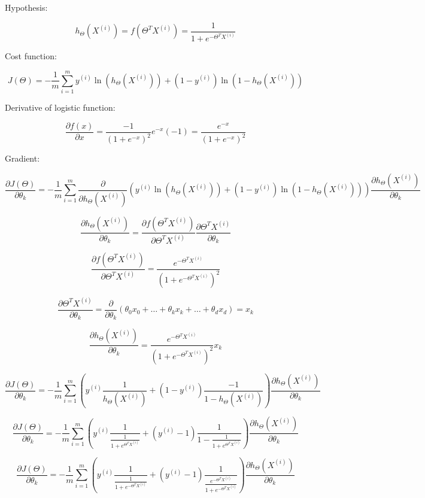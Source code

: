\documentclass[a4, article]{article}
\begin{document}
Hypothesis:

\[ h_{\Theta}(X^{(i)}) = f(\Theta^T X^{(i)}) = \frac{1}{1 + e^{-\Theta^T X^{(i)}}} \]

Cost function:

\[ J(\Theta) = - \frac{1}{m} \sum_{i=1}^{m} y^{(i)} \ln(h_{\Theta}(X^{(i)})) + (1 - y^{(i)}) \ln(1 - h_{\Theta}(X^{(i)})) \]

Derivative of logistic function:

\[ \frac{\partial f(x) }{\partial x} = \frac{-1}{(1 + e^{-x})^2} e^{-x} (-1)  = \frac{e^{-x}}{(1 + e^{-x})^2}\]

Gradient:

\[ \frac{\partial J(\Theta)}{\partial \theta_k} = - \frac{1}{m} \sum_{i=1}^{m} \frac{\partial}{\partial h_{\Theta}(X^{(i)})}(y^{(i)} \ln(h_{\Theta}(X^{(i)})) + (1 - y^{(i)}) \ln(1 - h_{\Theta}(X^{(i)}))) \frac{\partial h_{\Theta}(X^{(i)})}{\partial \theta_k} \]

\[ \frac{\partial h_{\Theta}(X^{(i)})}{\partial \theta_k} = \frac{\partial f(\Theta^T X^{(i)})}{\partial \Theta^T X^{(i)}} \frac{\partial \Theta^T X^{(i)}}{\partial \theta_k} \]

\[ \frac{\partial f(\Theta^T X^{(i)})}{\partial \Theta^T X^{(i)}} = \frac{e^{-\Theta^T X^{(i)}}}{(1 + e^{-\Theta^T X^{(i)}})^2} \]

\[ \frac{\partial \Theta^T X^{(i)}}{\partial \theta_k} = \frac{\partial}{\partial \theta_k}(\theta_0 x_0 + \dots + \theta_k x_k + \dots + \theta_d x_d ) = x_k\]

\[ \frac{\partial h_{\Theta}(X^{(i)})}{\partial \theta_k} = \frac{e^{-\Theta^T X^{(i)}}}{(1 + e^{-\Theta^T X^{(i)}})^2} x_k \]

\[ \frac{\partial J(\Theta)}{\partial \theta_k} = - \frac{1}{m} \sum_{i=1}^{m} (y^{(i)} \frac{1}{h_{\Theta}(X^{(i)})} + (1 - y^{(i)}) \frac{-1}{1 - h_{\Theta}(X^{(i)})}) \frac{\partial h_{\Theta}(X^{(i)})}{\partial \theta_k} \]

\[ \frac{\partial J(\Theta)}{\partial \theta_k} = - \frac{1}{m} \sum_{i=1}^{m} (y^{(i)} \frac{1}{\frac{1}{1+e^{\Theta^T X^{(i)}}}} + (y^{(i)} - 1) \frac{1}{1 - \frac{1}{1+e^{\Theta^T X^{(i)}}}}) \frac{\partial h_{\Theta}(X^{(i)})}{\partial \theta_k} \]

\[ \frac{\partial J(\Theta)}{\partial \theta_k} = - \frac{1}{m} \sum_{i=1}^{m} (y^{(i)} \frac{1}{\frac{1}{1+e^{-\Theta^T X^{(i)}}}} + (y^{(i)} - 1) \frac{1}{\frac{e^{-\Theta^T X^{(i)}}}{1+e^{-\Theta^T X^{(i)}}}}) \frac{\partial h_{\Theta}(X^{(i)})}{\partial \theta_k} \]
\end{document}
